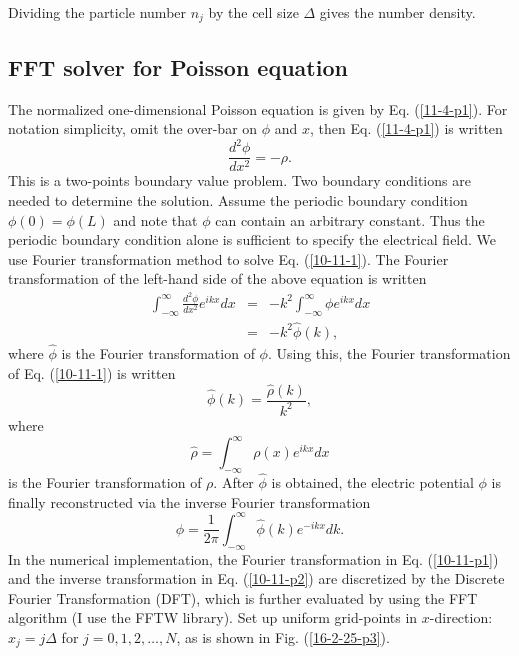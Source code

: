 \documentclass{article}
\begin{document}
Dividing the particle number $n_j$ by the cell size $\Delta$ gives the number
density.

\subsection{FFT solver for Poisson equation}

The normalized one-dimensional Poisson equation is given by Eq.
(\ref{11-4-p1}). For notation simplicity, omit the over-bar on $\phi$ and $x$,
then Eq. (\ref{11-4-p1}) is written
\begin{equation}
  \label{10-11-1} \frac{d^2 \phi}{d x^2} = - \rho .
\end{equation}
This is a two-points boundary value problem. Two boundary conditions are
needed to determine the solution. Assume the periodic boundary condition $\phi
(0) = \phi (L)$ and note that $\phi$ can contain an arbitrary constant. Thus
the periodic boundary condition alone is sufficient to specify the electrical
field. We use Fourier transformation method to solve Eq. (\ref{10-11-1}). The
Fourier transformation of the left-hand side of the above equation is written
\begin{eqnarray}
  \int_{- \infty}^{\infty} \frac{d^2 \phi}{d x^2} e^{i k x} d x & = & - k^2
  \int_{- \infty}^{\infty} \phi e^{i k x} d x \nonumber\\
  & = & - k^2 \hat{\phi} (k), 
\end{eqnarray}
where $\hat{\phi}$ is the Fourier transformation of $\phi$. Using this, the
Fourier transformation of Eq. (\ref{10-11-1}) is written
\begin{equation}
  \label{10-11-p5} \hat{\phi} (k) = \frac{\hat{\rho} (k)}{k^2},
\end{equation}
where
\begin{equation}
  \label{10-11-p1} \hat{\rho} = \int_{- \infty}^{\infty} \rho (x) e^{i k x} d
  x
\end{equation}
is the Fourier transformation of $\rho$. After $\hat{\phi}$ is obtained, the
electric potential $\phi$ is finally reconstructed via the inverse Fourier
transformation
\begin{equation}
  \label{10-11-p2} \phi = \frac{1}{2 \pi} \int_{- \infty}^{\infty} \hat{\phi}
  (k) e^{- i k x} d k.
\end{equation}
In the numerical implementation, the Fourier transformation in Eq.
(\ref{10-11-p1}) and the inverse transformation in Eq. (\ref{10-11-p2}) are
discretized by the Discrete Fourier Transformation (DFT), which is further
evaluated by using the FFT algorithm (I use the FFTW library). Set up uniform
grid-points in $x$-direction: $x_j = j \Delta$ for $j = 0, 1, 2, \ldots, N$,
as is shown in Fig. (\ref{16-2-25-p3}).
\end{document}
